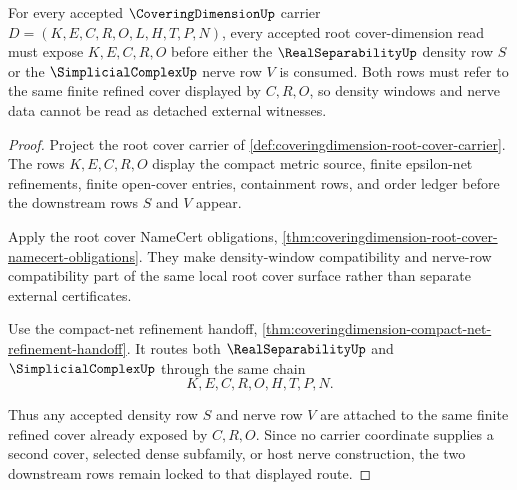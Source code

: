 \begin{theorem}
\label{thm:coveringdimension-root-cover-density-nerve-lock}
For every accepted $\CoveringDimensionUp$ carrier $D=(K,E,C,R,O,L,H,T,P,N)$, every accepted root cover-dimension read must expose $K,E,C,R,O$ before either the $\RealSeparabilityUp$ density row $S$ or the $\SimplicialComplexUp$ nerve row $V$ is consumed. Both rows must refer to the same finite refined cover displayed by $C,R,O$, so density windows and nerve data cannot be read as detached external witnesses.
\end{theorem}
\begin{proof}
Project the root cover carrier of \autoref{def:coveringdimension-root-cover-carrier}. The rows $K,E,C,R,O$ display the compact metric source, finite epsilon-net refinements, finite open-cover entries, containment rows, and order ledger before the downstream rows $S$ and $V$ appear.

Apply the root cover NameCert obligations, \autoref{thm:coveringdimension-root-cover-namecert-obligations}. They make density-window compatibility and nerve-row compatibility part of the same local root cover surface rather than separate external certificates.

Use the compact-net refinement handoff, \autoref{thm:coveringdimension-compact-net-refinement-handoff}. It routes both $\RealSeparabilityUp$ and $\SimplicialComplexUp$ through the same chain
$$
K,E,C,R,O,H,T,P,N .
$$

Thus any accepted density row $S$ and nerve row $V$ are attached to the same finite refined cover already exposed by $C,R,O$. Since no carrier coordinate supplies a second cover, selected dense subfamily, or host nerve construction, the two downstream rows remain locked to that displayed route.
\end{proof}

